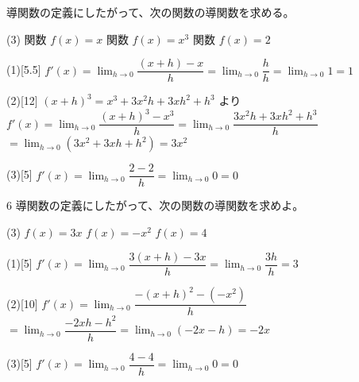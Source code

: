 \documentclass[14pt,dvipdfmx]{jsarticle}
\begin{document}
\vspace{-1.4zw}%
\quad
導関数の定義にしたがって、次の関数の導関数を求める。
\begin{tasks}[label=(\arabic*), label-width=1.6zw, item-indent=2zw, after-item-skip=0.08em](3)
  \task 関数 $f(x)=x$
  \task 関数 $f(x)=x^{3}$
  \task 関数 $f(x)=2$
\end{tasks}
\vspace{-0.2em}
\begin{answerbox}{(1)}[5.5]
  $f'(x)=\lim_{h \to 0}\dfrac{(x+h)-x}{h}
    =\lim_{h \to 0}\dfrac{h}{h}=\lim_{h \to 0}1=1$
\end{answerbox}
\begin{answerbox}{(2)}[12]
  $(x+h)^{3}=x^{3}+3x^{2}h+3xh^{2}+h^{3}$ より\\[0.25em]
  $f'(x)=\lim_{h \to 0}\dfrac{(x+h)^{3}-x^{3}}{h}
    =\lim_{h \to 0}\dfrac{3x^{2}h+3xh^{2}+h^{3}}{h}$\\[0.3em]
  $=\lim_{h \to 0}(3x^{2}+3xh+h^{2})=3x^{2}$
\end{answerbox}
\begin{answerbox}{(3)}[5]
  $f'(x)=\lim_{h \to 0}\dfrac{2-2}{h}=\lim_{h \to 0}0=0$
\end{answerbox}

\vspace{0.25em}
\begin{practiceprob}{6}
  導関数の定義にしたがって、次の関数の導関数を求めよ。
  \begin{tasks}[label=(\arabic*), label-width=1.6zw, item-indent=2zw, after-item-skip=0.08em](3)
    \task $f(x)=3x$
    \task $f(x)=-x^{2}$
    \task $f(x)=4$
  \end{tasks}
\end{practiceprob}
\vspace{-0.35em}
\begin{answerbox}{(1)}[5]
  $f'(x)=\lim_{h \to 0}\dfrac{3(x+h)-3x}{h}
    =\lim_{h \to 0}\dfrac{3h}{h}=3$
\end{answerbox}
\begin{answerbox}{(2)}[10]
  $f'(x)=\lim_{h \to 0}\dfrac{-(x+h)^{2}-(-x^{2})}{h}$\\[0.35em]
  $=\lim_{h \to 0}\dfrac{-2xh-h^{2}}{h}
    =\lim_{h \to 0}(-2x-h)=-2x$
\end{answerbox}
\begin{answerbox}{(3)}[5]
  $f'(x)=\lim_{h \to 0}\dfrac{4-4}{h}=\lim_{h \to 0}0=0$
\end{answerbox}
\end{document}
